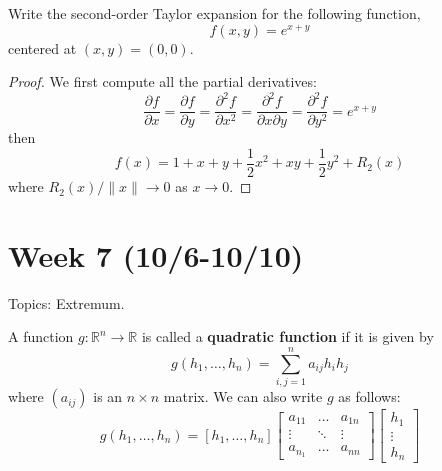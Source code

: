 \documentclass[openany]{book}
\newcommand{\R}{\mathbb{R}}
\begin{document}
\begin{prob}
    Write the second-order Taylor expansion for the following function, 
    \begin{equation*}
        f(x,y)=e^{x+y}
    \end{equation*}
    centered at $(x,y)=(0,0)$.
\end{prob}
\begin{proof}
    We first compute all the partial derivatives:
    \begin{equation*}
        \frac{\partial f}{\partial x}=\frac{\partial f}{\partial y}=\frac{\partial^2f}{\partial x^2}=\frac{\partial^2f}{\partial x\partial y}=\frac{\partial^2f}{\partial y^2}=e^{x+y}
    \end{equation*}
    then 
    \begin{equation*}
        f(x)=1+x+y+\frac{1}{2}x^2+xy+\frac{1}{2}y^2+R_2(x)
    \end{equation*}
    where $R_2(x)/\|x\|\to 0$ as $x\to 0$.
\end{proof}


\newpage 
\section*{\centering Week 7 (10/6-10/10)}


\renewcommand\thesection{\arabic{section}}

\noindent
Topics: Extremum. 





\begin{defn}
    A function $g:\R^n\to\R$ is called a \textbf{quadratic function} if it is given by 
    \begin{equation*}
        g(h_1,\dots, h_n)=\sum_{i,j=1}^na_{ij}h_ih_j
    \end{equation*}
    where $(a_{ij})$ is an $n\times n$ matrix. We can also write $g$ as follows:
    \begin{equation*}
        g(h_1,\dots,h_n)=[h_1,\dots,h_n]\begin{bmatrix}
            a_{11}&\dots &a_{1n}\\
            \vdots&\ddots &\vdots\\
            a_{n_1}&\dots&a_{nn}
        \end{bmatrix}\begin{bmatrix}
            h_1\\
            \vdots\\
            h_n
        \end{bmatrix}
    \end{equation*}

\end{defn}
\end{document}
